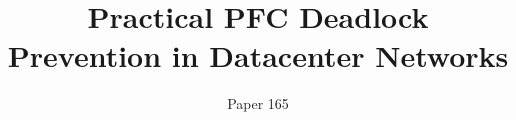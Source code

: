 \documentclass[letterpaper,twocolumn,fleqn]{sig-alternate-10pt}
\begin{document}
\title{Practical PFC Deadlock Prevention in Datacenter Networks}
\author{Paper 165}
\maketitle
















\end{document}
